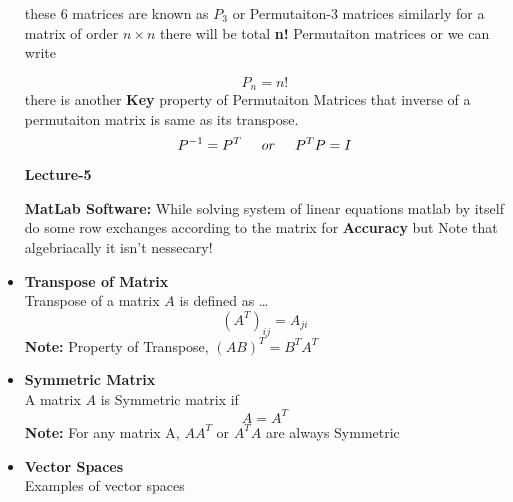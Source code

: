 \documentclass[a4paper,11pt]{article}
\numberwithin{equation}{section}
\begin{document}
\begin{itemize}
these $6$ matrices are known as $P_3$ or Permutaiton-3 matrices similarly for a matrix of order $n \times n$ there will be total \textbf{n!} Permutaiton matrices or we can write 

\begin{equation}
    P_n=n!
\end{equation}
there is another \textbf{Key} property of Permutaiton Matrices that inverse of a permutaiton matrix is same as its transpose.
\begin{equation}
    P^{-1}=P^T \hspace{0.5cm} or \hspace{0.5cm} P^TP=I
\end{equation}
\begin{center}
    \Huge{\textbf{Lecture-5}}
\end{center}
\vspace{5pt}


\textbf{MatLab Software: }While solving system of linear equations matlab by itself do some row exchanges according to the matrix for \textbf{Accuracy} but Note that algebriacally it isn't nessecary!\\

\item \textbf{Transpose of Matrix} \\

    Transpose of a matrix $A$ is defined as \dots
    \begin{equation}
        (A^T)_{ij}=A_{ji}
    \end{equation}
    \textbf{Note: } Property of Transpose,  $(AB)^T=B^TA^T$
\item \textbf{Symmetric Matrix} \\

    A matrix $A$ is Symmetric matrix if
    \begin{equation}
        A=A^T
    \end{equation}
\textbf{Note: }For any matrix A, $AA^T$ or $A^TA$ are always Symmetric

\item \textbf{Vector Spaces}\\

    Examples of vector spaces


\end{itemize}
\end{document}
